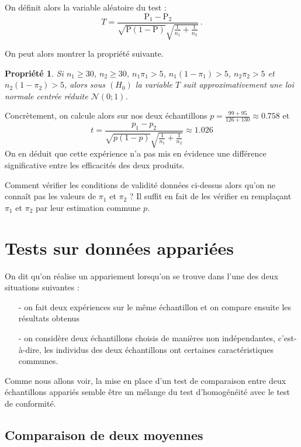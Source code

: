 \documentclass[12pt, a4paper]{book}
\newtheorem{prop}[thm]{Propriété}
\numberwithin{equation}{section}
\begin{document}
On définit alors la variable aléatoire du test :
$$
T=\frac{\mathrm{P}_1-\mathrm{P}_2}{\sqrt{\mathrm{P}(1-\mathrm{P})} \sqrt{\frac{1}{n_1} + \frac{1}{n_2}} }\,.
$$

On peut alors montrer la propriété suivante.
\begin{prop}
Si $n_1\geq 30$, $n_2\geq 30$, $n_1 \pi_1>5$,  $n_1(1-\pi_1)>5$, $n_2 \pi_2>5$ et  $n_2(1-\pi_2)>5$,
alors sous $(H_0)$ la variable $T$ suit approximativement une loi normale centrée réduite $\mathcal{N}(0;1)$.
\end{prop}

Concrètement, on calcule alors sur nos deux échantillons $p=\frac{99 + 95}{126 + 130}\approx 0.758$ et
$$
t=\frac{p_1-p_2}{\sqrt{p(1-p)} \sqrt{\frac{1}{n_1} + \frac{1}{n_2}} } \approx 1.026
$$
On en déduit que cette expérience n'a pas mis en évidence une différence significative entre les efficacités
des deux produits.

Comment vérifier les conditions de validité données ci-dessus alors qu'on ne connaît pas les valeurs
de $\pi_1$ et $\pi_2$ ? Il suffit en fait de les vérifier en remplaçant $\pi_1$ et $\pi_2$ par leur 
estimation commune $p$.


\section{Tests sur données appariées}

On dit qu'on réalise un appariement lorsqu'on se trouve dans l'une des deux situations suivantes :
\begin{itemize}
\item[-] on fait deux expériences sur le même échantillon et on compare ensuite les résultats obtenus
\item[-] on considère deux échantillons choisis de manières non indépendantes, c'est-à-dire, les individus des deux échantillons ont certaines caractéristiques communes.
\end{itemize}

Comme nous allons voir, la mise en place d'un test de comparaison entre deux échantillons appariés
semble être un mélange du test d'homogénéité avec le test de conformité.

\subsection{Comparaison de deux moyennes}
\end{document}
